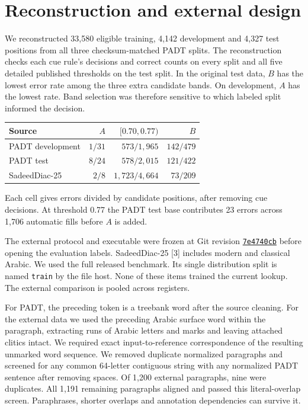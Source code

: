 \documentclass[11pt]{article}
\begin{document}
\section{Reconstruction and external design}
We reconstructed 33,580 eligible training, 4,142 development and 4,327 test positions from all three checksum-matched PADT splits. The reconstruction checks each cue rule's decisions and correct counts on every split and all five detailed published thresholds on the test split. In the original test data, \(B\) has the lowest error rate among the three extra candidate bands. On development, \(A\) has the lowest rate. Band selection was therefore sensitive to which labeled split informed the decision.

\begin{center}
\begin{tabular}{lrrr}
\toprule
Source & \(A\) & \([0.70,0.77)\) & \(B\)\\
\midrule
PADT development & \(1/31\) & \(573/1{,}965\) & \(142/479\)\\
PADT test & \(8/24\) & \(578/2{,}015\) & \(121/422\)\\
SadeedDiac-25 & \(2/8\) & \(1{,}723/4{,}664\) & \(73/209\)\\
\bottomrule
\end{tabular}
\end{center}
Each cell gives errors divided by candidate positions, after removing cue decisions. At threshold 0.77 the PADT test base contributes 23 errors across 1,706 automatic fills before \(A\) is added.

The external protocol and executable were frozen at Git revision
\href{https://github.com/lluiseriksson/THE-ERIKSSON-PROGRAMME/tree/7e4740cbde3418df07ba7f0d8fcbe02814285196/audits/arabic-vowel-workload}{\texttt{7e4740cb}} before opening the evaluation labels. SadeedDiac-25 [3] includes modern and classical Arabic. We used the full released benchmark. Its single distribution split is named \texttt{train} by the file host. None of these items trained the current lookup. The external comparison is pooled across registers.

For PADT, the preceding token is a treebank word after the source cleaning. For the external data we used the preceding Arabic surface word within the paragraph, extracting runs of Arabic letters and marks and leaving attached clitics intact. We required exact input-to-reference correspondence of the resulting unmarked word sequence. We removed duplicate normalized paragraphs and screened for any common 64-letter contiguous string with any normalized PADT sentence after removing spaces. Of 1,200 external paragraphs, nine were duplicates. All 1,191 remaining paragraphs aligned and passed this literal-overlap screen. Paraphrases, shorter overlaps and annotation dependencies can survive it.
\end{document}
